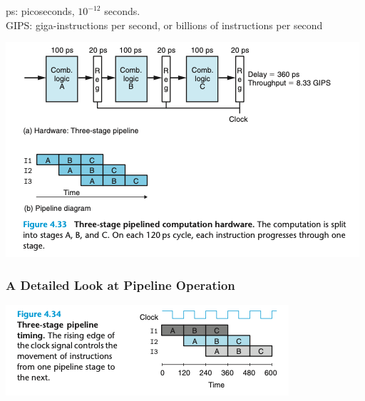\documentclass[11pt]{article}
\begin{document}
ps: picoseconds, \(10^{-12}\) seconds.\\
GIPS: giga-instructions per second, or billions of instructions per second\\

\begin{center}
\includegraphics[width=.9\linewidth]{pics/figure4.33-three-stage-pipelined-computation-hardeware.png}
\end{center}

\subsubsection{A Detailed Look at Pipeline Operation}
\label{sec:org60c783b}

\begin{center}
\includegraphics[width=.9\linewidth]{pics/figure4.34-three-stage-pipeline.png}
\end{center}
\end{document}
